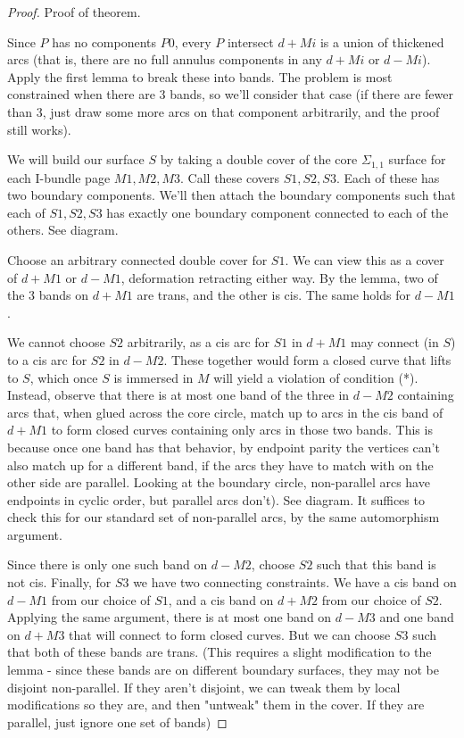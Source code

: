 \documentclass[12pt]{amsart}
\theoremstyle{definition}
\newcommand{\Si}{\Sigma}
\begin{document}
\begin{proof}

Proof of theorem.

Since $P$ has no components $P0$, every $P$ intersect $d+Mi$ is a union of thickened
arcs (that is, there are no full annulus components in any $d+Mi$ or $d-Mi$). Apply
the first lemma to break these into bands. The problem is most constrained when
there are 3 bands, so we'll consider that case (if there are fewer than 3, just
draw some more arcs on that component arbitrarily, and the proof still works).

We will build our surface $S$ by taking a double cover of the core $\Si_{1,1}$ surface
for each I-bundle page $M1,M2,M3$. Call these covers $S1,S2,S3$. Each of these has
two boundary components. We'll then attach the boundary components such that
each of $S1,S2,S3$ has exactly one boundary component connected to each of the
others. See diagram.

Choose an arbitrary connected double cover for $S1$. We can view this as a cover
of $d+M1$ or $d-M1$, deformation retracting either way. By the lemma, two of the
3 bands on $d+M1$ are trans, and the other is cis. The same holds for $d-M1$.

We cannot choose $S2$ arbitrarily, as a cis arc for $S1$ in $d+M1$ may connect
(in $S$)
to a cis arc for $S2$ in $d-M2$. These together would form a closed curve that
lifts to $S$, which once $S$ is immersed in $M$ will yield a violation of condition
(*). Instead, observe that there is at most one band of the three in $d-M2$
containing arcs that, when glued across the core circle, match up to arcs in
the cis band of $d+M1$ to form closed curves containing only arcs in those two
bands. This is because once one band has that behavior, by endpoint parity the
vertices can't also match up for a different band, if the arcs they have to
match with on the other side are parallel. Looking at the boundary circle,
non-parallel arcs have endpoints in cyclic order, but parallel arcs don't). See
diagram. It suffices to check this for our standard set of non-parallel arcs,
by the same automorphism argument.

Since there is only one such band on $d-M2$, choose $S2$ such that this band is not
cis.  Finally, for $S3$ we have two connecting constraints. We have a cis band on
$d-M1$ from our choice of $S1$, and a cis band on $d+M2$ from our choice of
$S2$.
Applying the same argument, there is at most one band on $d-M3$ and one band on
$d+M3$ that will connect to form closed curves. But we can choose $S3$ such that
both of these bands are trans. (This requires a slight modification to the
lemma - since these bands are on different boundary surfaces, they may not be
disjoint non-parallel. If they aren't disjoint, we can tweak them by local
modifications so they are, and then "untweak" them in the cover. If they are
parallel, just ignore one set of bands)


\end{proof}
\end{document}
